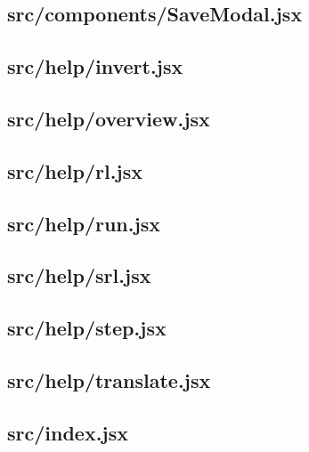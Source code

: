 \subsection{src/components/SaveModal.jsx}
\label{app:client_src_components_SaveModal_jsx}

\subsection{src/help/invert.jsx}
\label{app:client_src_help_invert_jsx}

\subsection{src/help/overview.jsx}
\label{app:client_src_help_overview_jsx}

\subsection{src/help/rl.jsx}
\label{app:client_src_help_rl_jsx}

\subsection{src/help/run.jsx}
\label{app:client_src_help_run_jsx}

\subsection{src/help/srl.jsx}
\label{app:client_src_help_srl_jsx}

\subsection{src/help/step.jsx}
\label{app:client_src_help_step_jsx}

\subsection{src/help/translate.jsx}
\label{app:client_src_help_translate_jsx}

\subsection{src/index.jsx}
\label{app:client_src_index_jsx}


